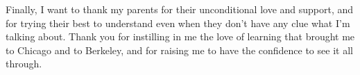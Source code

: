 \documentclass{ucbthesis}
\begin{document}
\begin{frontmatter}
\begin{acknowledgements}
Finally, I want to thank my parents for their unconditional love and support, and for trying their best to understand even when they don't have any clue what I'm talking about. Thank you for instilling in me the love of learning that brought me to Chicago and to Berkeley, and for raising me to have the confidence to see it all through.
\end{acknowledgements}

\end{frontmatter}

\pagestyle{headings}












\appendix





\end{document}
